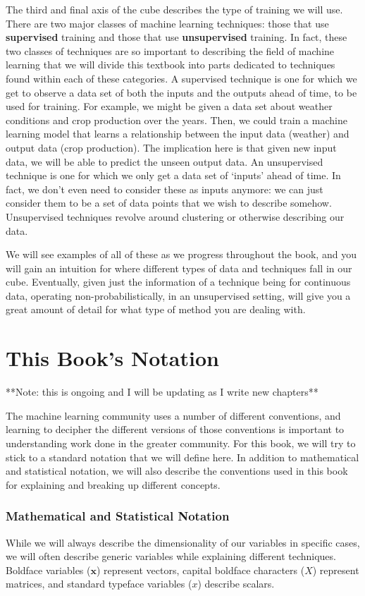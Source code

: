 The third and final axis of the cube describes the type of training we will use. There are two major classes of machine learning techniques: those that use \textbf{supervised} training and those that use \textbf{unsupervised} training. In fact, these two classes of techniques are so important to describing the field of machine learning that we will divide this textbook into parts dedicated to techniques found within each of these categories. A supervised technique is one for which we get to observe a data set of both the inputs and the outputs ahead of time, to be used for training. For example, we might be given a data set about weather conditions and crop production over the years. Then, we could train a machine learning model that learns a relationship between the input data (weather) and output data (crop production). The implication here is that given new input data, we will be able to predict the unseen output data. An unsupervised technique is one for which we only get a data set of `inputs' ahead of time. In fact, we don't even need to consider these as inputs anymore: we can just consider them to be a set of data points that we wish to describe somehow. Unsupervised techniques revolve around clustering or otherwise describing our data.

We will see examples of all of these as we progress throughout the book, and you will gain an intuition for where different types of data and techniques fall in our cube. Eventually, given just the information of a technique being for continuous data, operating non-probabilistically, in an unsupervised setting, will give you a great amount of detail for what type of method you are dealing with.

\section{This Book's Notation}
**Note: this is ongoing and I will be updating as I write new chapters**

The machine learning community uses a number of different conventions, and learning to decipher the different versions of those conventions is important to understanding work done in the greater community. For this book, we will try to stick to a standard notation that we will define here. In addition to mathematical and statistical notation, we will also describe the conventions used in this book for explaining and breaking up different concepts.

\subsubsection{Mathematical and Statistical Notation}
While we will always describe the dimensionality of our variables in specific cases, we will often describe generic variables while explaining different techniques. Boldface variables ($\textbf{x}$) represent vectors, capital boldface characters ($X$) represent matrices, and standard typeface variables ($x$) describe scalars.

